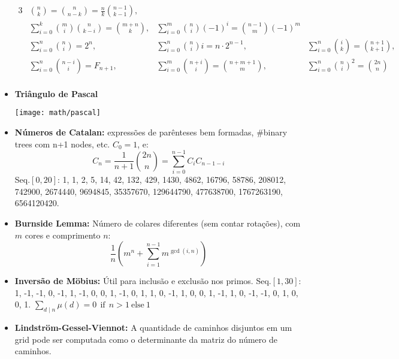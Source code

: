 \begin{small}
\begin{itemize}
    \begin{alignat*}{3}
        &\binom{n}{k} = \binom{n}{n - k} = \frac{n}{k} \binom{n - 1}{k - 1}, \\
        &\sum_{i=0}^{k} \binom{m}{i} \binom{n}{k-i} = \binom{m+n}{k},
        &\sum_{i=0}^{m} \binom{n}{i} (-1)^i = \binom{n - 1}{m}  (-1)^m       \\
        &\sum_{i=0}^{n} \binom{n}{i} = 2^n                         , \quad      
        &\sum_{i=0}^{n} \binom{n}{i} i = n \cdot 2^{n - 1}         , \qquad\qquad\quad
        &\sum_{i=0}^{n} \binom{i}{k} = \binom{n+1}{k+1}            ,           \\
        &\sum_{i=0}^{n} \binom{n-i}{i} = F_{n+1}                   ,
        &\sum_{i=0}^{m} \binom{n + i}{i} = \binom{n + m + 1}{m}    ,   \quad
        &\sum_{i=0}^{n} \binom{n}{i}^2 = \binom{2n}{n}                        \\
    \end{alignat*}


    \item\textbf{Triângulo de Pascal} \\[0.5ex]
    \begin{center} 
        \texttt{[image: math/pascal]} 
    \end{center}
    
    \item\textbf{Números de Catalan:} expressões de parênteses bem formadas, \#binary trees com n+1 nodes, etc. $C_0 = 1$, e:
    \[ C_n = \frac{1}{n+1} \binom{2n}{n} = \sum_{i=0}^{n-1} C_i C_{n-1-i} \]
    Seq.$[0, 20]$: 1, 1, 2, 5, 14, 42, 132, 429, 1430, 4862, 16796, 58786, 208012, 742900, 2674440, 9694845, 35357670, 129644790, 477638700, 1767263190, 6564120420.

    \item\textbf{Burnside Lemma:} Número de colares diferentes (sem contar rotações), com $m$ cores e comprimento $n$:
    \[ \frac{1}{n} \left(m^n + \sum_{i=1}^{n-1} m^{\gcd(i, n)} \right) \]
    
    \item \textbf{Inversão de Möbius:} Útil para inclusão e exclusão nos primos. Seq.$[1, 30]$: 1, -1, -1, 0, -1, 1, -1, 0, 0, 1, -1, 0, 1, 1, 0, -1, 1, 0, 0, 1, -1, 1, 0, -1, -1, 0, 1, 0, 0, 1.
    $ \sum_{d \mid n} \mu(d) = 0 \ \ \text{if} \ \ n > 1 \ \text{else} \ 1 $ 


\item\textbf{Lindström-Gessel-Viennot:} A quantidade de caminhos disjuntos em um grid pode ser computada como o determinante da matriz do número de caminhos.



\end{itemize}
\end{small}
